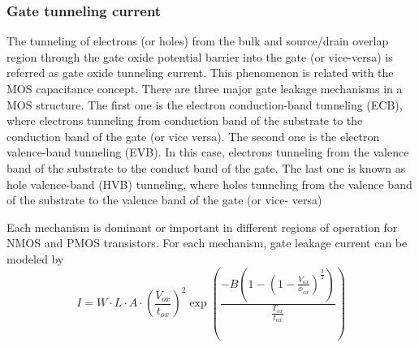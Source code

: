\subsubsection{Gate tunneling current}

The tunneling of electrons (or holes) from the bulk and source/drain overlap region through the gate oxide potential barrier into the gate (or vice-versa) is referred as gate oxide tunneling current.
This phenomenon is related with the MOS capacitance concept.
There are three major gate leakage mechanisms in a MOS structure.
The first one is the electron conduction-band tunneling (ECB), where electrons tunneling from conduction band of the substrate to the conduction band of the gate (or vice versa).
The second one is the electron valence-band tunneling (EVB). In this case, electrons tunneling from the valence band of the substrate to the conduct band of the gate.
The last one is known as hole valence-band (HVB) tunneling, where holes tunneling from the valence band of the substrate to the valence band of the gate (or vice- versa)

Each mechanism is dominant or important in different regions of operation for NMOS and PMOS transistors. For each mechanism, gate leakage current can be modeled by
\begin{equation}
I = W \cdot L \cdot A \cdot \left(\frac{V_{ox}}{t_{ox}}\right)^2\exp\left(\frac{-B\left(1-\left(1-\frac{V_{ox}}{\phi_{ox}}\right)^{\frac{3}{2}}\right)}{\frac{T_{ox}}{t_{ox}}}\right)
\end{equation}
